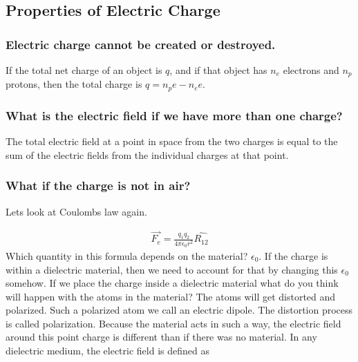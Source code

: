\subsection{Properties of Electric Charge}

\subsubsection{Electric charge cannot be created or destroyed.} 

If the total net charge of an object is $q$, and if that object has $n_e$ electrons and $n_p$ protons, then the total charge is $q=n_p e-n_e e$. 



\subsubsection{What is the electric field if we have more than one charge?}

The total electric field at a point in space from the two charges is equal to the sum of the electric fields from the individual charges at that point.


\subsubsection{What if the charge is not in air?} 

Lets look at Coulombs law again. 


\begin{eqnarray}
\vec{F_e}=\frac{q_1 q_2}{4 \pi \epsilon_0 r^2} \hat{R_{12}}
\end{eqnarray}\label{Coulombslaw2}
Which quantity in this formula depends on the material? $\epsilon_0$. If the charge is within a dielectric material, then we need to account for that by changing this $\epsilon_0$ somehow. If we place the charge inside a dielectric material what do you think will happen with the atoms in the material? The atoms will get distorted and polarized. Such a polarized atom we call an electric dipole. The distortion process is called polarization. Because the material acts in such a way, the electric field around this point charge is different than if there was no material. In any dielectric medium, the electric field is defined as


